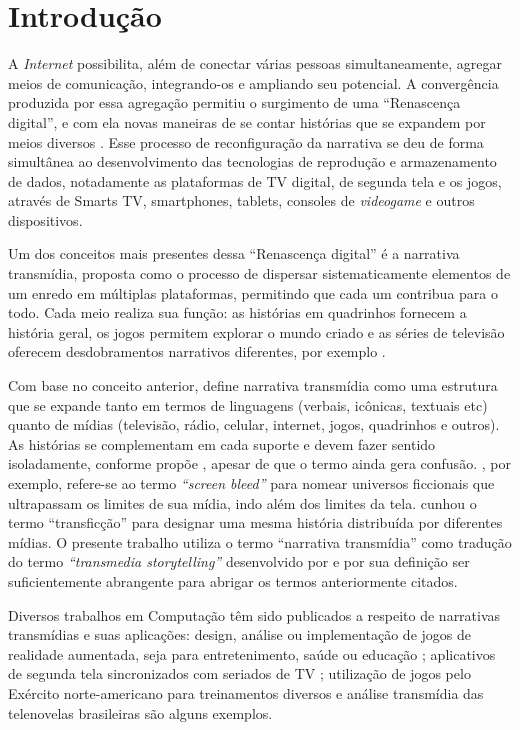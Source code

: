 \documentclass[
article,			%
11pt,				%
oneside,			%
a4paper,			%
english,			%
brazil,				%
sumario=tradicional
]{abntex2}
\begin{document}
  \section{Introdução}

  A \textit{Internet} possibilita, além de conectar várias pessoas simultaneamente, agregar meios de comunicação, integrando-os e ampliando seu potencial. A convergência produzida por essa agregação permitiu o surgimento de uma ``Renascença digital'', e com ela novas maneiras de se contar histórias que se expandem por meios diversos \cite{jenkins_2001}. Esse processo de reconfiguração da narrativa se deu de forma simultânea ao desenvolvimento das tecnologias de reprodução e armazenamento de dados, notadamente as plataformas de TV digital, de segunda tela e os jogos, através de Smarts TV, smartphones, tablets, consoles de \textit{videogame} e outros dispositivos.

  Um dos conceitos mais presentes dessa ``Renascença digital'' é a narrativa transmídia, proposta como o processo de dispersar sistematicamente elementos de um enredo em múltiplas plataformas, permitindo que cada um contribua para o todo. Cada meio realiza sua função: as histórias em quadrinhos fornecem a história geral, os jogos permitem explorar o mundo criado e as séries de televisão oferecem desdobramentos narrativos diferentes, por exemplo \cite{jenkins_fastcompany_2011}.

  Com base no conceito anterior,  define narrativa transmídia como uma estrutura que se expande tanto em termos de linguagens (verbais, icônicas, textuais etc) quanto de mídias (televisão, rádio, celular, internet, jogos, quadrinhos e outros). As histórias se complementam em cada suporte e devem fazer sentido isoladamente, conforme propõe , apesar de que o termo ainda gera confusão. , por exemplo, refere-se ao termo \textit{``screen bleed''} para nomear universos ficcionais que ultrapassam os limites de sua mídia, indo além dos limites da tela.  cunhou o termo ``transficção''  para  designar  uma  mesma  história  distribuída  por  diferentes  mídias. O presente trabalho utiliza o termo ``narrativa transmídia'' como tradução do termo \textit{``transmedia storytelling''} desenvolvido por  e por sua definição ser suficientemente abrangente para abrigar os termos anteriormente citados.

  Diversos trabalhos em Computação têm sido publicados a respeito de narrativas transmídias e suas aplicações: design, análise ou implementação de jogos de realidade aumentada, seja para entretenimento, saúde ou educação \cite{bonsignore_2012,evans_2014,johnston_2012,holler_2014}; aplicativos de segunda tela sincronizados com seriados de TV \cite{nandakumar_2014}; utilização de jogos pelo Exército norte-americano para treinamentos diversos \cite{raybourn_2014} e análise transmídia das telenovelas brasileiras \cite{murakami_2015} são alguns exemplos.
\end{document}
